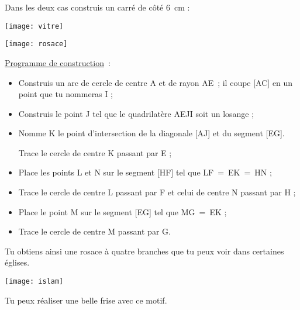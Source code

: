 \begin{enigme}

Dans les deux cas construis un carré de côté 6 cm :

\begin{minipage}[c]{0.3\linewidth}
\end{minipage}\hfill %
\begin{minipage}[c]{0.2\linewidth}
\centering
\texttt{[image: vitre]}
\end{minipage} \hfill %
\begin{minipage}[c]{0.2\linewidth}
\centering
\texttt{[image: rosace]}
\end{minipage} \hfill %
\begin{minipage}[c]{0.3\linewidth}
\end{minipage} 


\underline{Programme de construction} :
\begin{itemize}
 \item Construis un arc de cercle de centre A et de rayon AE ; il coupe [AC] en un point que tu nommeras I ;
 \item Construis le point J tel que le quadrilatère AEJI soit un losange ;
 \item Nomme K le point d'intersection de la diagonale [AJ] et du segment [EG].
                
Trace le cercle de centre K passant par E ;
 \item Place les points L et N sur le segment [HF] tel que LF = EK = HN ;
 \item Trace le cercle de centre L passant par F et celui de centre N passant par H ;
 \item Place le point M sur le segment [EG] tel que MG = EK ;
 \item Trace le cercle de centre M passant par G.
 \end{itemize}
Tu obtiens ainsi une rosace à quatre branches que tu peux voir dans certaines églises.
 
 \end{enigme}
 
 \vspace*{2em}
 

\begin{enigme}

\begin{center}
\texttt{[image: islam]}
\end{center}

Tu peux réaliser une belle frise avec ce motif.
\end{enigme} 
